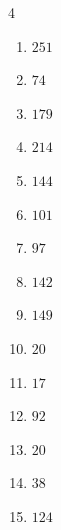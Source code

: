 \begin{multicols}{4}
\begin{enumerate}
  \item $251$


  \item $74$


  \item $179$


  \item $214$


  \item $144$


  \item $101$


  \item $97$


  \item $142$


  \item $149$


  \item $20$


  \item $17$


\columnbreak %

\resetques

  \item $92$


  \item $20$


  \item $38$


  \item $124$



\end{enumerate}
\end{multicols}
